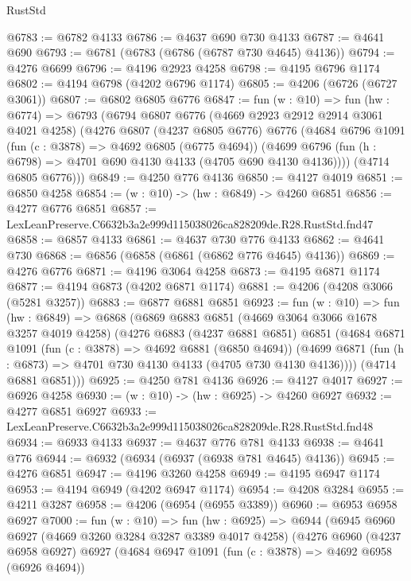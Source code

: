 \begin{lexlean}{RustStd}
\begin{coremodule}
@6783 := @6782 @4133
@6786 := @4637 @690 @730 @4133
@6787 := @4641 @690
@6793 := @6781 (@6783 (@6786 (@6787 @730 @4645) @4136))
@6794 := @4276 @6699
@6796 := @4196 @2923 @4258
@6798 := @4195 @6796 @1174
@6802 := @4194 @6798 (@4202 @6796 @1174)
@6805 := @4206 (@6726 (@6727 @3061))
@6807 := @6802 @6805 @6776
@6847 := fun (w : @10) =>
  fun (hw : @6774) =>
  @6793
    (@6794
      @6807
      @6776
      (@4669 @2923 @2912 @2914 @3061 @4021 @4258)
      (@4276
        @6807
        (@4237 @6805 @6776)
        @6776
        (@4684
          @6796
          @1091
          (fun (c : @3878) => @4692 @6805 (@6775 @4694))
          (@4699 @6796 (fun (h : @6798) => @4701 @690 @4130 @4133 (@4705 @690 @4130 @4136))))
        (@4714 @6805 @6776)))
@6849 := @4250 @776 @4136
@6850 := @4127 @4019
@6851 := @6850 @4258
@6854 := (w : @10) -> (hw : @6849) -> @4260 @6851
@6856 := @4277 @6776 @6851
@6857 := LexLeanPreserve.C6632b3a2e999d115038026ca828209de.R28.RustStd.fnd47
@6858 := @6857 @4133
@6861 := @4637 @730 @776 @4133
@6862 := @4641 @730
@6868 := @6856 (@6858 (@6861 (@6862 @776 @4645) @4136))
@6869 := @4276 @6776
@6871 := @4196 @3064 @4258
@6873 := @4195 @6871 @1174
@6877 := @4194 @6873 (@4202 @6871 @1174)
@6881 := @4206 (@4208 @3066 (@5281 @3257))
@6883 := @6877 @6881 @6851
@6923 := fun (w : @10) =>
  fun (hw : @6849) =>
  @6868
    (@6869
      @6883
      @6851
      (@4669 @3064 @3066 @1678 @3257 @4019 @4258)
      (@4276
        @6883
        (@4237 @6881 @6851)
        @6851
        (@4684
          @6871
          @1091
          (fun (c : @3878) => @4692 @6881 (@6850 @4694))
          (@4699 @6871 (fun (h : @6873) => @4701 @730 @4130 @4133 (@4705 @730 @4130 @4136))))
        (@4714 @6881 @6851)))
@6925 := @4250 @781 @4136
@6926 := @4127 @4017
@6927 := @6926 @4258
@6930 := (w : @10) -> (hw : @6925) -> @4260 @6927
@6932 := @4277 @6851 @6927
@6933 := LexLeanPreserve.C6632b3a2e999d115038026ca828209de.R28.RustStd.fnd48
@6934 := @6933 @4133
@6937 := @4637 @776 @781 @4133
@6938 := @4641 @776
@6944 := @6932 (@6934 (@6937 (@6938 @781 @4645) @4136))
@6945 := @4276 @6851
@6947 := @4196 @3260 @4258
@6949 := @4195 @6947 @1174
@6953 := @4194 @6949 (@4202 @6947 @1174)
@6954 := @4208 @3284
@6955 := @4211 @3287
@6958 := @4206 (@6954 (@6955 @3389))
@6960 := @6953 @6958 @6927
@7000 := fun (w : @10) =>
  fun (hw : @6925) =>
  @6944
    (@6945
      @6960
      @6927
      (@4669 @3260 @3284 @3287 @3389 @4017 @4258)
      (@4276
        @6960
        (@4237 @6958 @6927)
        @6927
        (@4684
          @6947
          @1091
          (fun (c : @3878) => @4692 @6958 (@6926 @4694))

\end{coremodule}
\end{lexlean}
